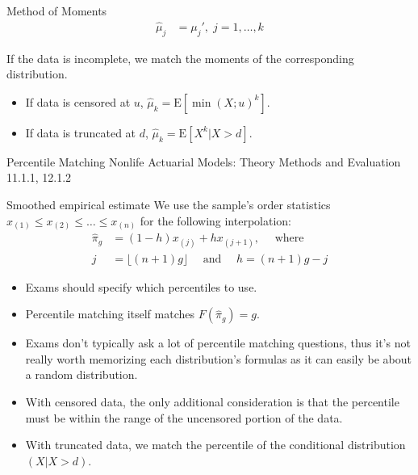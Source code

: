 \begin{CHPT_SUMM_AUTO_NUMB}[label = {L.-27}]{Method of Moments}
\begin{align*}
	 \hat{\mu}_{j}	&=	 \mu_{j}', \; j = 1, \dots, k
\end{align*}
\tcbline

If the data is incomplete, we match the moments of the corresponding distribution.
\begin{itemize}[leftmargin = *]
	\item	If data is censored at $u$, $\hat{\mu}_{k}	=	 \text{E}[\min(X; u)^{k}]$.
	\item	If data is truncated at $d$, $\hat{\mu}_{k}	=	 \text{E}[X^{k} | X > d]$.
\end{itemize}
\end{CHPT_SUMM_AUTO_NUMB}

\begin{CHPT_SUMM_AUTO_NUMB}[label = {L.-28}]{Percentile Matching}
Nonlife Actuarial Models: Theory Methods and Evaluation 11.1.1, 12.1.2

\tcbline

\begin{algo}{Smoothed empirical estimate}
We use the sample's order statistics $x_{(1)} \le x_{(2)} \le \dots \le x_{(n)}$ for the following interpolation:
\begin{align*}
	\hat\pi_{g}
	&=	(1 - h)x_{(j)} + h x_{(j + 1)}, \quad \text{ where }	\\
	j
	&=	\lfloor (n + 1) g \rfloor	\quad
	\text{ and }	 \quad
	h
	=	(n + 1) g - j
\end{align*}
\end{algo}
\begin{itemize}[leftmargin = *]
	\item	Exams should specify which percentiles to use.
	\item	Percentile matching itself matches $F(\hat{\pi}_{g})	=	g$.
	\item	Exams don't typically ask a lot of percentile matching questions, thus it's not really worth memorizing each distribution's formulas as it can easily be about a random distribution.
\end{itemize}

\tcbline

\begin{itemize}[leftmargin = *]
	\item	With censored data, the only additional consideration is that the percentile must be within the range of the uncensored portion of the data.
	\item	With truncated data, we match the percentile of the conditional distribution $(X | X > d)$.
\end{itemize}
\end{CHPT_SUMM_AUTO_NUMB}

